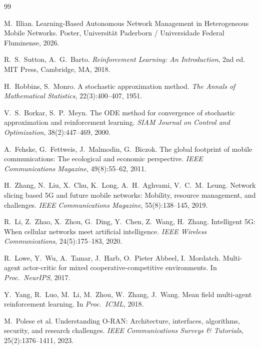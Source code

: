 ﻿\documentclass[a4paper,12pt]{article}
\theoremstyle{definition}
\begin{document}
\begin{thebibliography}{99}

M.\ Illian.
\newblock Learning-Based Autonomous Network Management in Heterogeneous Mobile
  Networks.
\newblock Poster, Universit\"at Paderborn / Universidade Federal Fluminense, 2026.

R.\ S.\ Sutton, A.\ G.\ Barto.
\newblock \emph{Reinforcement Learning: An Introduction}, 2nd ed.
\newblock MIT Press, Cambridge, MA, 2018.

H.\ Robbins, S.\ Monro.
\newblock A stochastic approximation method.
\newblock \emph{The Annals of Mathematical Statistics}, 22(3):400--407, 1951.

V.\ S.\ Borkar, S.\ P.\ Meyn.
\newblock The ODE method for convergence of stochastic approximation and
  reinforcement learning.
\newblock \emph{SIAM Journal on Control and Optimization}, 38(2):447--469, 2000.

A.\ Fehske, G.\ Fettweis, J.\ Malmodin, G.\ Biczok.
\newblock The global footprint of mobile communications: The ecological and
  economic perspective.
\newblock \emph{IEEE Communications Magazine}, 49(8):55--62, 2011.

H.\ Zhang, N.\ Liu, X.\ Chu, K.\ Long, A.\ H.\ Aghvami, V.\ C.\ M.\ Leung.
\newblock Network slicing based 5G and future mobile networks: Mobility,
  resource management, and challenges.
\newblock \emph{IEEE Communications Magazine}, 55(8):138--145, 2019.

R.\ Li, Z.\ Zhao, X.\ Zhou, G.\ Ding, Y.\ Chen, Z.\ Wang, H.\ Zhang.
\newblock Intelligent 5G: When cellular networks meet artificial intelligence.
\newblock \emph{IEEE Wireless Communications}, 24(5):175--183, 2020.

R.\ Lowe, Y.\ Wu, A.\ Tamar, J.\ Harb, O.\ Pieter Abbeel, I.\ Mordatch.
\newblock Multi-agent actor-critic for mixed cooperative-competitive
  environments.
\newblock In \emph{Proc.\ NeurIPS}, 2017.

Y.\ Yang, R.\ Luo, M.\ Li, M.\ Zhou, W.\ Zhang, J.\ Wang.
\newblock Mean field multi-agent reinforcement learning.
\newblock In \emph{Proc.\ ICML}, 2018.

M.\ Polese et al.
\newblock Understanding O-RAN: Architecture, interfaces, algorithms, security,
  and research challenges.
\newblock \emph{IEEE Communications Surveys \& Tutorials}, 25(2):1376--1411, 2023.


\end{thebibliography}
\end{document}
